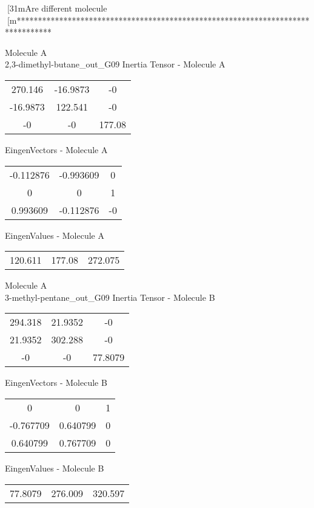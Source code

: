 [31mAre different molecule
[m********************************************************************************
\newpage
\begin{multicols}{2}
\begin{center}
Molecule A \\ 
2,3-dimethyl-butane_out_G09
Inertia Tensor - Molecule A \\
\vtab
\begin{tabular}{|c c c|}
270.146	 & 	-16.9873	 & 	-0	 \\
-16.9873	 & 	122.541	 & 	-0	 \\
-0	 & 	-0	 & 	177.08
\end{tabular}

\vtab
 EingenVectors - Molecule A     \\
\vtab
\begin{tabular}{|c c c|}
-0.112876	 & 	-0.993609	 & 	0	 \\
0	 & 	0	 & 	1	 \\
0.993609	 & 	-0.112876	 & 	-0
\end{tabular}

\vtab
 EingenValues - Molecule A     \\
\vtab
\begin{tabular}{|c c c|}
120.611	 & 	177.08	 & 	272.075
\end{tabular}
\columnbreak
Molecule A \\ 
3-methyl-pentane_out_G09
Inertia Tensor - Molecule B \\
\vtab
\begin{tabular}{|c c c|}
294.318	 & 	21.9352	 & 	-0	 \\
21.9352	 & 	302.288	 & 	-0	 \\
-0	 & 	-0	 & 	77.8079
\end{tabular}

\vtab
 EingenVectors - Molecule B     \\
\vtab
\begin{tabular}{|c c c|}
0	 & 	0	 & 	1	 \\
-0.767709	 & 	0.640799	 & 	0	 \\
0.640799	 & 	0.767709	 & 	0
\end{tabular}

\vtab
 EingenValues - Molecule B     \\
\vtab
\begin{tabular}{|c c c|}
77.8079	 & 	276.009	 & 	320.597
\end{tabular}
\end{center}
\end{multicols}
